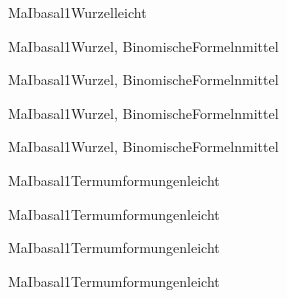 \documentclass[12pt]{article}
\begin{document}
\begin{Add}{MaI}{basal1}{Wurzel}{leicht}
\end{Add}

\begin{Add}{MaI}{basal1}{Wurzel, BinomischeFormeln}{mittel}
\end{Add}

\begin{Add}{MaI}{basal1}{Wurzel, BinomischeFormeln}{mittel}
\end{Add}

\begin{Add}{MaI}{basal1}{Wurzel, BinomischeFormeln}{mittel}
\end{Add}
\begin{Add}{MaI}{basal1}{Wurzel, BinomischeFormeln}{mittel}
\end{Add}

\begin{Add}{MaI}{basal1}{Termumformungen}{leicht}
\end{Add}

\begin{Add}{MaI}{basal1}{Termumformungen}{leicht}
\end{Add}

\begin{Add}{MaI}{basal1}{Termumformungen}{leicht}
\end{Add}

\begin{Add}{MaI}{basal1}{Termumformungen}{leicht}
\end{Add}
\end{document}
